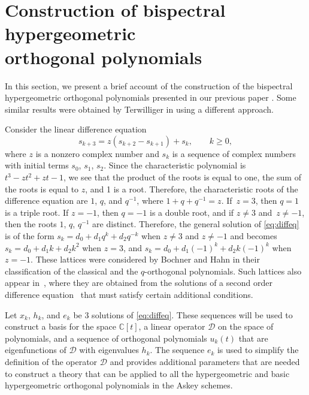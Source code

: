 \documentclass[10pt,a4paper]{amsart}
\def\cD{\mathcal D}
\numberwithin{equation}{section}
\begin{document}
\section[Construction of bispectral hypergeometric orthogonal polynomials]{Construction of bispectral hypergeometric\\ orthogonal polynomials}\label{section2}

In this section, we present a brief account of the construction of the
 bispectral hypergeometric orthogonal polynomials presented in our previous paper \cite{Uni}. Some similar results were obtained by Terwilliger in \cite{Terw,Ter3,Ter2} using a different approach.

Consider the linear difference equation
\begin{equation}\label{eq:diffeq}
 s_{k+3} = z ( s_{k+2} -s_{k+1}) + s_k, \qquad k\ge 0,
\end{equation}
where $z$ is a nonzero complex number and $s_k$ is a sequence of complex numbers with initial terms $s_0$, $s_1$, $s_2$. Since the characteristic polynomial is $t^3 - z t^2 + z t -1$, we see that the product of the roots is equal to one, the sum of the roots is equal to $z$, and 1 is a root. Therefore,
the characteristic roots of the difference equation are $1$, $q$, and $q^{-1}$, where $1 + q + q^{-1}=z$. If~${z=3}$, then $q=1$ is a triple root. If $z=-1$, then $q=-1$ is a double root, and if $z\ne 3$ and~${z\ne -1}$, then the roots $1$, $q$, $q^{-1}$ are distinct. Therefore, the general solution of \eqref{eq:diffeq} is of the form
$s_k= d_0 + d_1 q^k + d_2 q^{-k}$ when $z\ne 3$ and $z \ne -1$ and becomes $s_k=d_0 + d_1 k + d_2 k^2$ when $z=3$, and $s_k= d_0 +d_1 (-1)^k + d_2 k ( -1)^k$ when $z=-1$. These lattices were considered by Bochner and Hahn in their classification of the classical and the $q$-orthogonal polynomials. Such lattices also appear in~\cite{NSU}, where they are obtained from the solutions of a second order difference equation~\mbox{\cite[equation~(3.1.12)]{NSU}} that must satisfy certain additional conditions.

Let $x_k$, $h_k$, and $e_k$ be 3 solutions of \eqref{eq:diffeq}. These sequences will be used to construct a basis for the space ${\mathbb C}[t]$, a linear operator $\cD$ on the space of polynomials, and a sequence of orthogonal polynomials $u_k(t)$ that are eigenfunctions of $\cD$ with eigenvalues $h_k$. The sequence $e_k$ is used to simplify the definition of the operator $\cD$ and provides additional parameters that are needed to construct a theory that can be applied to all the hypergeometric and basic hypergeometric orthogonal polynomials in the Askey schemes.
\end{document}

